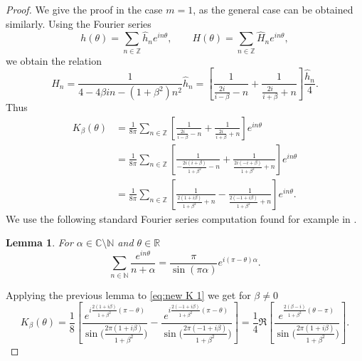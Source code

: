 \documentclass[10pt]{amsart}
\theoremstyle{plain}
\newtheorem{lemma}[theorem]{Lemma}
\theoremstyle{definition}
\let\bt\beta
\let\tht\theta
\newcommand{\bbZ}{\mathbb Z}
\begin{document}
\begin{proof}
We give the proof in the case $m = 1$, as the general case can be obtained similarly.
Using the Fourier series
\begin{equation*}
h(\tht) = \sum_{n\in\bbZ} \hat{h}_n e^{in\tht},\qquad H(\tht) = \sum_{n\in\bbZ} \hat{H}_n e^{in\tht},
\end{equation*}
we obtain the relation
\begin{equation}\label{eq:elliptic-Fourier}
\hat{H}_n = \frac{1}{4-4\bt in - (1+\beta^2)n^2} \hat{h}_n= \left[ \frac{1}{ \frac{2i}{i-\beta}- n } + \frac{1}{\frac{2i}{i+\beta} + n} \right] \frac{\hat{h}_n}{4}.
\end{equation}
Thus
\begin{equation}\label{eq:new K 1}
\begin{aligned}
K_{\beta}(\theta)&=\frac{1}{8\pi} \sum_{n\in\bbZ} \left[ \frac{1}{ \frac{2i}{i-\beta}- n } + \frac{1}{\frac{2i}{i+\beta} + n} \right] e^{in\tht }\\
&=\frac{1}{8\pi} \sum_{n\in\bbZ} \left[ \frac{1}{- \frac{2i(i+\beta)}{1+\beta^2}- n } + \frac{1}{\frac{2i(-i+\beta)}{1+\beta^2} + n} \right] e^{in\tht }\\
&=\frac{1}{8\pi} \sum_{n\in\bbZ} \left[\frac{1}{\frac{2(1+i\beta)}{1+\beta^2} + n} - \frac{1}{ \frac{2(-1+i\beta)}{1+\beta^2}+ n } \right] e^{in\tht }.
\end{aligned}
\end{equation}
We use the following standard Fourier series computation found for example in \cite{stein2003princeton}.
\begin{lemma}\label{lem:FS}
For $\alpha \in \mathbb{C}\setminus \mathbb{N}$ and $\theta \in \mathbb{R}$
\[
\sum_{n\in \mathbb{N}}\frac{e^{in\theta}}{n+\alpha}=\frac{\pi}{\sin(\pi\alpha)}e^{i(\pi-\theta)\alpha}.
\]
\end{lemma}
Applying the previous lemma to \eqref{eq:new K 1} we get for $\beta\neq 0$
\begin{equation}\label{eq:cln K}
K_{\beta}(\theta)=\frac{1}{8}\left[\frac{e^{i\frac{2(1+i\beta)}{1+\beta^2}(\pi-\theta)}}{\sin\bigl(\frac{2\pi(1+i\beta)}{1+\beta^2}\bigr)}-\frac{e^{i\frac{2(-1+i\beta)}{1+\beta^2}(\pi-\theta)}}{\sin\bigl(\frac{2\pi(-1+i\beta)}{1+\beta^2}\bigr)}\right]=\frac{1}{4}\Re \left[\frac{e^{\frac{2(\beta-i)}{1+\beta^2}(\theta-\pi)}}{\sin\bigl(\frac{2\pi(1+i\beta)}{1+\beta^2}\bigr)}\right].
\end{equation}


\end{proof}
\end{document}
